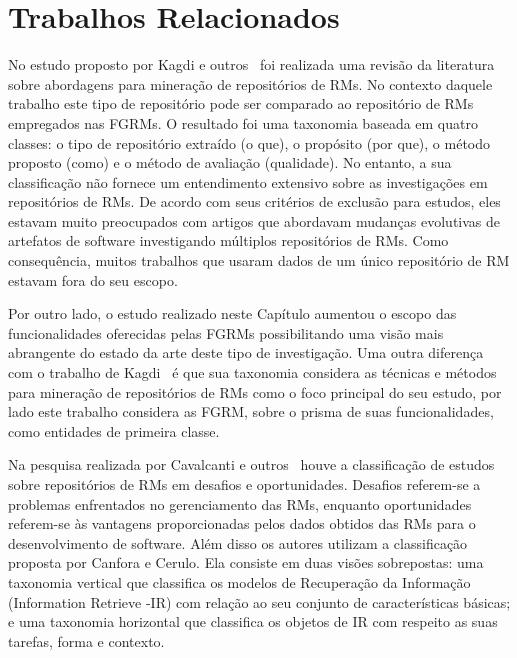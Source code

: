 

\section{Trabalhos Relacionados}
\label{sec:map_trabalhos_relacionados}

No estudo proposto por Kagdi e outros~\cite{kagdi2012assigning} foi realizada
uma revisão da literatura sobre abordagens para mi\-ne\-ra\-ção de repositórios
de RMs. No contexto daquele trabalho este tipo de repositório pode ser comparado
ao repositório de RMs empregados nas FGRMs.  O resultado foi uma taxonomia
baseada em quatro classes: o tipo de repositório extraído (o que), o propósito
(por que), o método proposto (como) e o método de avaliação (qualidade). No
entanto, a sua classificação não fornece um entendimento extensivo sobre as
investigações em repositórios de RMs\@. De acordo com seus critérios de exclusão
para estudos, eles estavam muito preocupados com artigos que abordavam mudanças
evolutivas de artefatos de software investigando múltiplos repositórios de RMs.
Como consequência, muitos trabalhos que usaram dados de um único repositório de
RM estavam fora do seu escopo.

Por outro lado, o estudo realizado neste Capítulo aumentou o escopo das
funcionalidades oferecidas pelas FGRMs possibilitando uma visão mais abrangente
do estado da arte deste tipo de investigação. Uma outra diferença com o trabalho
de Kagdi~\cite{kagdi2012assigning} é que sua taxonomia considera as técnicas e
métodos para mineração de repositórios de RMs como o foco principal do seu
estudo, por lado este trabalho considera as FGRM, sobre o prisma de suas
funcionalidades, como entidades de primeira classe.

Na pesquisa realizada por Cavalcanti e outros~\cite{cavalcanti2014challenges}
houve a classificação de estudos sobre repositórios de RMs em desafios e
oportunidades. Desafios referem-se a problemas enfrentados no gerenciamento das
RMs, enquanto oportunidades referem-se às vantagens proporcionadas pelos dados
obtidos das  RMs para o desenvolvimento de software. Além disso os autores
utilizam a classificação proposta por Canfora e Cerulo\cite{cerulo2004taxonomy}.
Ela consiste em duas visões sobrepostas: uma taxonomia vertical que classifica
os modelos de Recuperação da Informação (Information Retrieve \@-\@ IR) com
relação ao seu conjunto de características básicas; e uma taxonomia horizontal
que classifica os objetos de IR com respeito as suas tarefas, forma e contexto.

